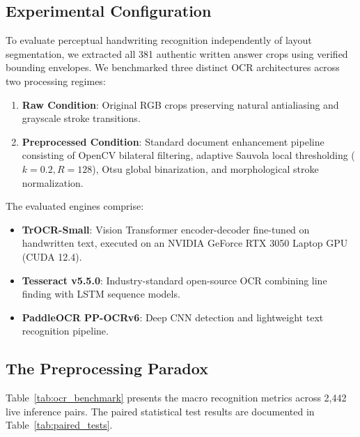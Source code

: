 \documentclass[journal]{IEEEtran}
\begin{document}
\subsection{Experimental Configuration}
To evaluate perceptual handwriting recognition independently of layout segmentation, we extracted all 381 authentic written answer crops using verified bounding envelopes. We benchmarked three distinct OCR architectures across two processing regimes:
\begin{enumerate}
    \item \textbf{Raw Condition}: Original RGB crops preserving natural antialiasing and grayscale stroke transitions.
    \item \textbf{Preprocessed Condition}: Standard document enhancement pipeline consisting of OpenCV bilateral filtering, adaptive Sauvola local thresholding ($k = 0.2, R = 128$), Otsu global binarization, and morphological stroke normalization.
\end{enumerate}
The evaluated engines comprise:
\begin{itemize}
    \item \textbf{TrOCR-Small}: Vision Transformer encoder-decoder fine-tuned on handwritten text, executed on an NVIDIA GeForce RTX 3050 Laptop GPU (CUDA 12.4).
    \item \textbf{Tesseract v5.5.0}: Industry-standard open-source OCR combining line finding with LSTM sequence models.
    \item \textbf{PaddleOCR PP-OCRv6}: Deep CNN detection and lightweight text recognition pipeline.
\end{itemize}

\subsection{The Preprocessing Paradox}
Table~\ref{tab:ocr_benchmark} presents the macro recognition metrics across 2,442 live inference pairs. The paired statistical test results are documented in Table~\ref{tab:paired_tests}.
\end{document}
